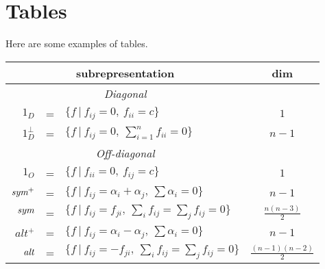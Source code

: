 \documentclass[11pt,a4paper]{article}
\newcommand{\sym}{\mbox{\em sym}}                           %
\newcommand{\alt}{\mbox{\em alt}}                           %
\begin{document}
\section{Tables}

Here are some examples of tables.



\begin{center}
\begin{tabular}{rclc}
\multicolumn{3}{c}{subrepresentation} & dim \\
\hline
\multicolumn{3}{c}{\em Diagonal}&\\
$1_D$ &=& ${\scriptstyle \{f~|~f_{ij}=0,~ f_{ii}=c\}}$& ${\scriptstyle 1}$\\
$1^\perp_D$ &=& ${\scriptstyle \{f~|~f_{ij}=0,~ \sum_{i=1}^n f_{ii}=0\}}$& ${\scriptstyle n-1}$\\
\hline
\multicolumn{3}{c}{\em Off-diagonal}&\\
$1_O$ &=& ${\scriptstyle \{f~|~f_{ii}=0,~ f_{ij}=c\}}$ & ${\scriptstyle 1}$\\
$\sym^+$ &=& ${\scriptstyle \{f~|~f_{ij}= \alpha_i+\alpha_j,~ \sum \alpha_i=0\}}$&
${\scriptstyle n-1}$\\
$\sym$ &=& ${\scriptstyle \{f~|~f_{ij}=f_{ji},~ \sum_i f_{ij}=\sum_j f_{ij}=0\}}$&
${\scriptstyle \frac{n(n-3)}{2}}$\\
$alt^+$  &=& ${\scriptstyle \{f~|~f_{ij}= \alpha_i-\alpha_j,~ \sum \alpha_i=0\}}$& ${\scriptstyle n-1
}$\\
$\alt$ &=& ${\scriptstyle \{f~|~f_{ij}=- f_{ji},~ \sum_i f_{ij}=\sum_j f_{ij}=0\}}$&
${\scriptstyle \frac{(n-1)(n-2)}{2}}$
\end{tabular}
\end{center}
\end{document}
